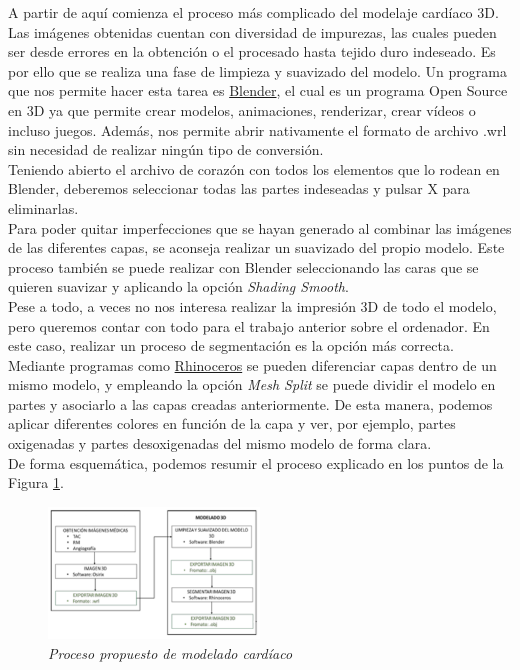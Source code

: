 \documentclass[a4paper,12pt]{article}
\begin{document}
A partir de aquí comienza el proceso más complicado del modelaje cardíaco 3D. Las imágenes obtenidas cuentan con diversidad de impurezas, las cuales pueden ser desde errores en la obtención o el procesado hasta tejido duro indeseado. Es por ello que se realiza una fase de limpieza y suavizado del modelo. Un programa que nos permite hacer esta tarea es \href{https://www.blender.org/}{Blender}, el cual es un programa Open Source en 3D ya que permite crear modelos, animaciones, renderizar, crear vídeos o incluso juegos. Además, nos permite abrir nativamente el formato de archivo .wrl sin necesidad de realizar ningún tipo de conversión.\\

Teniendo abierto el archivo de corazón con todos los elementos que lo rodean en Blender, deberemos seleccionar todas las partes indeseadas y pulsar X para eliminarlas.\\

Para poder quitar imperfecciones que se hayan generado al combinar las imágenes de las diferentes capas, se aconseja realizar un suavizado del propio modelo. Este proceso también se puede realizar con Blender seleccionando las caras que se quieren suavizar y aplicando la opción \emph{Shading Smooth}.\\

Pese a todo, a veces no nos interesa realizar la impresión 3D de todo el modelo, pero queremos contar con todo para el trabajo anterior sobre el ordenador. En este caso, realizar un proceso de segmentación es la opción más correcta. Mediante programas como \href{https://www.rhino3d.com/}{Rhinoceros} se pueden diferenciar capas dentro de un mismo modelo, y empleando la opción \emph{Mesh Split} se puede dividir el modelo en partes y asociarlo a las capas creadas anteriormente. De esta manera, podemos aplicar diferentes colores en función de la capa y ver, por ejemplo, partes oxigenadas y partes desoxigenadas del mismo modelo de forma clara.\\

De forma esquemática, podemos resumir el proceso explicado en los puntos de la Figura \ref{modeloCardio}.\\

	\begin{figure}[!ht]
	\begin{center}
	  \includegraphics[width=0.5\textwidth]{Figuras/modeloCardio.png}
	  \caption{\emph{Proceso propuesto de modelado cardíaco}}
	\end{center}
	\label{modeloCardio}
	\end{figure}
\end{document}
